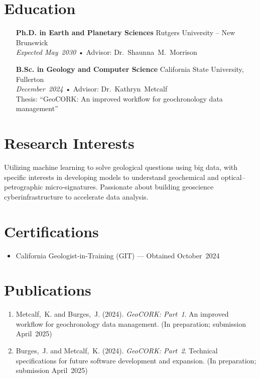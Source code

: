 \documentclass[10pt]{res}
\begin{document}
\section{Education}
\begin{itemize}[leftmargin=0.5cm]
  \item[\textbf{Ph.D. in Earth and Planetary Sciences} \hfill Rutgers University – New Brunswick \\]
    \textit{Expected May 2030} • Advisor: Dr.~Shaunna~M.~Morrison
  \item[\textbf{B.Sc. in Geology and Computer Science} \hfill California State University, Fullerton \\]
    \textit{December 2024} • Advisor: Dr.~Kathryn~Metcalf \\ Thesis: ``GeoCORK: An improved workflow for geochronology data management''
\end{itemize}

\section{Research Interests}
Utilizing machine learning to solve geological questions using big data, with specific interests in developing models to understand geochemical and optical–petrographic micro‑signatures. Passionate about building geoscience cyberinfrastructure to accelerate data analysis.

\section{Certifications}
\begin{itemize}[noitemsep]
  \item California Geologist‑in‑Training (GIT) — Obtained October 2024
\end{itemize}

\section{Publications}
\begin{enumerate}[label=\arabic*., leftmargin=0.5cm]
  \item Metcalf, K. and Burges, J. (2024). \textit{GeoCORK: Part 1}. An improved workflow for geochronology data management. (In preparation; submission April 2025)
  \item Burges, J. and Metcalf, K. (2024). \textit{GeoCORK: Part 2}. Technical specifications for future software development and expansion. (In preparation; submission April 2025)
\end{enumerate}
\end{document}
